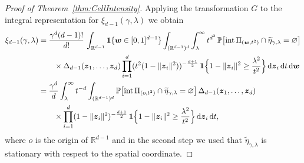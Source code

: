 \documentclass[11pt,a4paper]{article}
\theoremstyle{plain}
\theoremstyle{definition}
\theoremstyle{remark}
\newcommand{\dint}{\textup{d}}
\newcommand{\bz}{\boldsymbol{z}}
\newcommand{\bw}{\boldsymbol{w}}
\def\PP{\mathbb{P}}
\def\RR{\mathbb{R}}
\begin{document}
\begin{proof}[Proof of Theorem~\ref{thm:CellIntensity}]
	Applying the transformation $G$ to the integral representation for $\xi_{d-1}(\gamma,\lambda)$ we obtain
	\begin{align*}
		\xi_{d-1}(\gamma,\lambda) & = \frac{\gamma^d(d-1)!}{d!}\,\int_{\RR^{d-1}}{\bf 1}\{\bw\in[0,1]^{d-1}\}\int_{(\RR^{d-1})^d}\int_\lambda^\infty t^{d^2}\,\PP\big[{\rm int}\,\Pi_{(\bw,t^2)}\cap\widetilde\eta_{\gamma,\lambda}=\varnothing\big] \\
		                          & \qquad \times \Delta_{d-1}(\bz_1,\ldots,\bz_d)\prod_{i=1}^d(t^2(1-\|\bz_i\|^2))^{-\frac{d+1}{2}}\,{\bf 1}\Big\{1-\|\bz_i\|^2\geq\frac{\lambda^2}{t^2}\Big\}\,\dint\bz_i\,\dint t\,\dint \bw                      \\
		                          & =\frac{\gamma^d}{d}\int_\lambda^\infty t^{-d}\int_{(\RR^{d-1})^d}\PP\big[{\rm int}\,\Pi_{(o,t^2)}\cap\widetilde\eta_{\gamma,\lambda}=\varnothing\big]\,\Delta_{d-1}(\bz_1,\ldots,\bz_d)                          \\
		                          & \qquad \times \prod_{i=1}^d(1-\|\bz_i\|^2)^{-\frac{d+1}{2}}\,{\bf 1}\Big\{1-\|\bz_i\|^2\geq\frac{\lambda^2}{t^2}\Big\}\,\dint\bz_i\,\dint t,
	\end{align*}
	where $o$ is the origin of $\RR^{d-1}$ and in the second step we used that $\widetilde\eta_{\gamma,\lambda}$ is stationary with respect to the spatial coordinate.


\end{proof}
\end{document}
